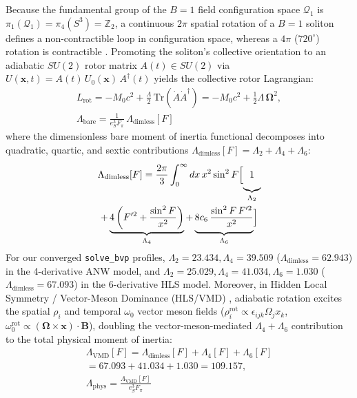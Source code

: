 \documentclass[10pt,aps,prd,twocolumn,superscriptaddress,nofootinbib,floatfix,longbibliography,showkeys]{revtex4-2}
\begin{document}
Because the fundamental group of the $B=1$ field configuration space $\mathcal{Q}_1$ is $\pi_1(\mathcal{Q}_1) = \pi_4(S^3) = \mathbb{Z}_2$, a continuous $2\pi$ spatial rotation of a $B=1$ soliton defines a non-contractible loop in configuration space, whereas a $4\pi$ ($720^\circ$) rotation is contractible \cite{ref11}. Promoting the soliton's collective orientation to an adiabatic $SU(2)$ rotor matrix $A(t) \in SU(2)$ via $U(\mathbf{x}, t) = A(t)\,U_0(\mathbf{x})\,A^\dagger(t)$ yields the collective rotor Lagrangian:
\begin{equation}\begin{gathered}
L_{\text{rot}} = -M_0 c^2 + \frac{\Lambda}{2}\,\text{Tr}\!\left(\dot{A}\dot{A}^\dagger\right) = -M_0 c^2 + \frac{1}{2}\Lambda\,\boldsymbol{\Omega}^2, \\
\Lambda_{\text{bare}} = \frac{1}{e_S^3 F_\pi}\,\Lambda_{\text{dimless}}[F]
\end{gathered}\end{equation}
where the dimensionless bare moment of inertia functional decomposes into quadratic, quartic, and sextic contributions $\Lambda_{\text{dimless}}[F] = \Lambda_2 + \Lambda_4 + \Lambda_6$:
\begin{multline}
\Lambda_{\text{dimless}}[F] = \frac{2\pi}{3}\int_0^\infty dx\,x^2 \sin^2 F\Bigl[\underbrace{1\vphantom{\left(\frac{\sin^2 F}{x^2}\right)}}_{\Lambda_2} \\
+ \underbrace{4\left(F'^2 + \frac{\sin^2 F}{x^2}\right)}_{\Lambda_4} + \underbrace{8 c_6\,\frac{\sin^2 F\,F'^2}{x^2}\vphantom{\left(\frac{\sin^2 F}{x^2}\right)}}_{\Lambda_6}\Bigr]
\end{multline}
For our converged \texttt{solve\_bvp} profiles, $\Lambda_2 = 23.434, \Lambda_4 = 39.509$ ($\Lambda_{\text{dimless}} = 62.943$) in the 4-derivative ANW model, and $\Lambda_2 = 25.029, \Lambda_4 = 41.034, \Lambda_6 = 1.030$ ($\Lambda_{\text{dimless}} = 67.093$) in the 6-derivative HLS model. Moreover, in Hidden Local Symmetry / Vector-Meson Dominance (HLS/VMD) \cite{ref6,ref7,ref8}, adiabatic rotation excites the spatial $\rho_i$ and temporal $\omega_0$ vector meson fields ($\rho_i^{\text{rot}} \propto \allowbreak \epsilon_{ijk}\Omega_j x_k$, $\omega_0^{\text{rot}} \propto \allowbreak (\boldsymbol{\Omega}\times\mathbf{x})\cdot\mathbf{B}$), doubling the vector-meson-mediated $\Lambda_4 + \Lambda_6$ contribution to the total physical moment of inertia:
\begin{equation}\begin{gathered}
\Lambda_{\text{VMD}}[F] = \Lambda_{\text{dimless}}[F] + \Lambda_4[F] + \Lambda_6[F] \\
= 67.093 + 41.034 + 1.030 = 109.157, \\
\Lambda_{\text{phys}} = \frac{\Lambda_{\text{VMD}}[F]}{e_S^3 F_\pi}
\end{gathered}\end{equation}
\end{document}
